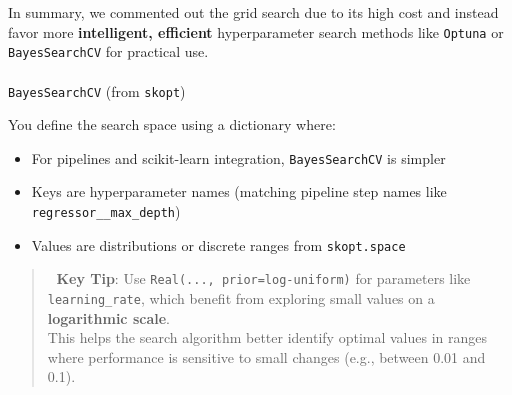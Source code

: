 \documentclass[
  letterpaper,
  DIV=11,
  numbers=noendperiod]{scrreprt}
\makeatletter
\let\oldparagraph\paragraph
\renewcommand{\paragraph}{
    \@ifstar
      \xxxParagraphStar
      \xxxParagraphNoStar
  }
\newcommand{\xxxParagraphStar}[1]{\oldparagraph*{#1}\mbox{}}
\newcommand{\xxxParagraphNoStar}[1]{\oldparagraph{#1}\mbox{}}
\providecommand{\tightlist}{%
  \setlength{\itemsep}{0pt}\setlength{\parskip}{0pt}}\usepackage{longtable,booktabs,array}
\makeatother
\begin{document}
In summary, we commented out the grid search due to its high cost and
instead favor more \textbf{intelligent, efficient} hyperparameter search
methods like \texttt{Optuna} or \texttt{BayesSearchCV} for practical
use.

\paragraph{\texorpdfstring{\texttt{BayesSearchCV} (from
\texttt{skopt})}{BayesSearchCV (from skopt)}}\label{bayessearchcv-from-skopt}

You define the search space using a dictionary where:

\begin{itemize}
\tightlist
\item
  For pipelines and scikit-learn integration, \texttt{BayesSearchCV} is
  simpler
\item
  Keys are hyperparameter names (matching pipeline step names like
  \texttt{\textquotesingle{}regressor\_\_max\_depth\textquotesingle{}})
\item
  Values are distributions or discrete ranges from \texttt{skopt.space}
\end{itemize}

\begin{quote}
🔹 \textbf{Key Tip}: Use
\texttt{Real(...,\ prior=\textquotesingle{}log-uniform\textquotesingle{})}
for parameters like \texttt{learning\_rate}, which benefit from
exploring small values on a \textbf{logarithmic scale}.\\
This helps the search algorithm better identify optimal values in ranges
where performance is sensitive to small changes (e.g., between 0.01 and
0.1).
\end{quote}
\end{document}
